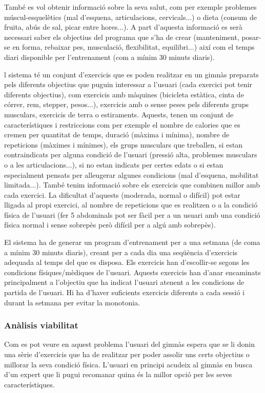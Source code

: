 \documentclass[a4paper, 12pt]{article}
\begin{document}
També es vol obtenir informació sobre la seva salut, com per exemple problemes múscul-esquelètics (mal d'esquena, articulacions, cervicals...) o dieta (consum de fruita, abús de sal, picar entre hores...). 
A part d'aquesta informació es serà necessari saber els objectius del programa que s'ha de crear (manteniment, posar-se en forma, rebaixar pes, musculació, flexibilitat, equilibri...) així com el temps diari disponible per l'entrenament (com a mínim 30 minuts diaris).
 
l sistema té un conjunt d'exercicis que es poden realitzar en un gimnàs preparats pels diferents objectius que puguin interessar a l'usuari (cada exercici pot tenir diferents objectius), com exercicis amb màquines (bicicleta estàtica, cinta de córrer, rem, stepper, pesos...), exercicis amb o sense peses pels diferents grups musculars, exercicis de terra o estiraments.
Aquests, tenen un conjunt de característiques i restriccions com per exemple el nombre de calories que es cremen per quantitat de temps, duració (màxima i mínima), nombre de repeticions (màximes i mínimes), els grups musculars que treballen, si estan contraindicats per alguna condició de l'usuari (pressió alta, problemes musculars o a les articulacions...), si no estan indicats per certes edats o si estan especialment pensats per alleugerar algunes condicions (mal d'esquena, mobilitat limitada...). També tenim informació sobre els exercicis que combinen millor amb cada exercici. La dificultat d'aquests (moderada, normal o difícil) pot estar lligada al propi exercici, al nombre de repeticions que es realitzen o a la condició física de l'usuari (fer 5 abdominals pot ser fàcil per a un usuari amb una condició física normal i sense sobrepès però difícil per a algú amb sobrepès).

El sistema ha de generar un program d'entrenament per a una setmana (de coma a mínim 30 minuts diaris), creant per a cada dia una seqüència d'exercicis adequada al temps del que es disposa. Els exercicis han d'escollir-se segons les condicions físiques/mèdiques de l'usuari. Aquests exercicis han d'anar encaminats principalment a l'objectiu que ha indicat l'usuari atenent a les condicions de partida de l'usuari. Hi ha d'haver suficients exercicis diferents a cada sessió i durant la setmana per evitar la monotonia. 

\subsubsection{Anàlisis viabilitat}
Com es pot veure en aquest problema l'usuari del gimnàs espera que se li donin una sèrie d'exercicis que ha de realitzar per poder assolir uns certs objectius o millorar la seva condició física. L'usuari en principi acudeix al gimnàs en busca d'un expert que li pugui recomanar quina és la millor opció per les seves característiques.
\end{document}
